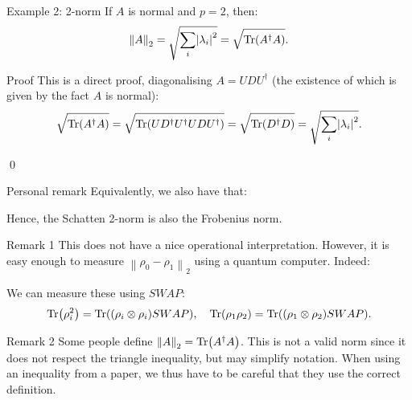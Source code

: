 \documentclass[a4paper]{article}
\begin{document}
\begin{parag}{Example 2: 2-norm}
    If $A$ is normal and $p = 2$, then: 
    \[\left\|A\right\|_2 = \sqrt{\sum_{i} \left|\lambda_i\right|^2} = \sqrt{\Tr\left(A^{\dagger} A\right)}.\]

    \begin{subparag}{Proof}
        This is a direct proof, diagonalising $A = U D U ^{\dagger}$ (the existence of which is given by the fact $A$ is normal): 
        \[\sqrt{\Tr\left(A^{\dagger} A\right)} = \sqrt{\Tr\left(U D^{\dagger} U^{\dagger} U D U^{\dagger}\right)} = \sqrt{\Tr\left(D^{\dagger} D\right)} = \sqrt{\sum_{i} \left|\lambda_i\right|^2}.\]

        \qed
    \end{subparag}
    
    \begin{subparag}{Personal remark}
        Equivalently, we also have that: 
        
        Hence, the Schatten 2-norm is also the Frobenius norm.
    \end{subparag}
    
    \begin{subparag}{Remark 1}
        This does not have a nice operational interpretation. However, it is easy enough to measure $\left\|\rho_0 - \rho_1\right\|_2$ using a quantum computer. Indeed: 

        We can measure these using $SWAP$: 
        \[\Tr\left(\rho_i^2\right) = \Tr\left(\left(\rho_i \otimes \rho_i\right) SWAP\right), \mathspace \Tr\left(\rho_1 \rho_2\right) = \Tr\left(\left(\rho_1 \otimes \rho_2\right) SWAP\right).\]
    \end{subparag}

    \begin{subparag}{Remark 2}
        Some people define $\left\|A\right\|_2 = \Tr\left(A^{\dagger} A\right)$. This is not a valid norm since it does not respect the triangle inequality, but may simplify notation. When using an inequality from a paper, we thus have to be careful that they use the correct definition.
    \end{subparag}
\end{parag}
\end{document}
